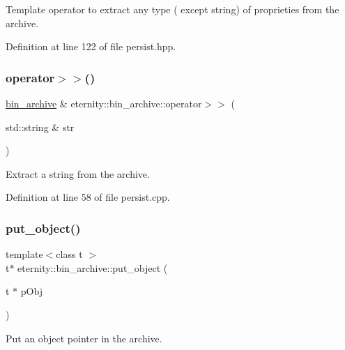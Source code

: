 Template operator to extract any type ( except string) of proprieties from the archive. 

Definition at line 122 of file persist.\+hpp.

\mbox{\label{classeternity_1_1bin__archive_a4cbbd8dff6b78cf3868a49b30261dd26}} 
\subsubsection{\texorpdfstring{operator$>$$>$()}{operator>>()}\hspace{0.1cm}{\footnotesize\ttfamily [2/2]}}
{\footnotesize\ttfamily \hyperlink{classeternity_1_1bin__archive}{bin\+\_\+archive} \& eternity\+::bin\+\_\+archive\+::operator$>$$>$ (\begin{DoxyParamCaption}\item[{std\+::string \&}]{str }\end{DoxyParamCaption})}



Extract a string from the archive. 



Definition at line 58 of file persist.\+cpp.

\mbox{\label{classeternity_1_1bin__archive_ab93c74313a8c6afdc65d4f2f2860502c}} 
\subsubsection{\texorpdfstring{put\+\_\+object()}{put\_object()}}
{\footnotesize\ttfamily template$<$class t $>$ \\
t$\ast$ eternity\+::bin\+\_\+archive\+::put\+\_\+object (\begin{DoxyParamCaption}\item[{t $\ast$}]{p\+Obj }\end{DoxyParamCaption})\hspace{0.3cm}{\ttfamily [inline]}}



Put an object pointer in the archive. 



